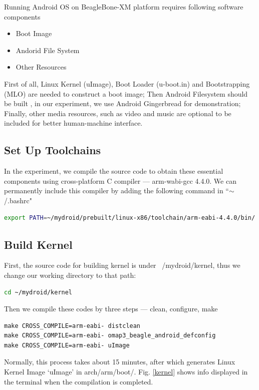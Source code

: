 \documentclass[12pt,journal,draftclsnofoot,onecolumn]{IEEEtran}
\begin{document}
Running Android OS on BeagleBone-XM platform requires following software components
\begin{itemize}
\item Boot Image
\item Andorid File System
\item Other Resources
\end{itemize}

First of all, Linux Kernel (uImage), Boot Loader (u-boot.in) and Bootstrapping (MLO)  are needed to construct a boot image; Then Android Filesystem should be built , in our experiment, we use Android Gingerbread for demonstration; Finally, other media resources, such as video and music are optional to be included for better human-machine interface. 

\subsection{Set Up Toolchains}
In the experiment, we compile the source code to obtain these essential components using cross-platform C compiler --- arm-wabi-gcc 4.4.0.
We can permanently include this compiler by adding the following command in ``$\sim$/.bashrc"

\begin{lstlisting}[language={bash}]
export PATH=~/mydroid/prebuilt/linux-x86/toolchain/arm-eabi-4.4.0/bin/:$PATH
\end{lstlisting}

\subsection{Build Kernel}
First, the source code for building kernel is under ~/mydroid/kernel, thus we change our working directory to that path:

\begin{lstlisting}[language={bash}]
cd ~/mydroid/kernel
\end{lstlisting}

Then we compile these codes by three steps --- clean, configure, make
\begin{lstlisting}[language={make}]
make CROSS_COMPILE=arm-eabi- distclean
make CROSS_COMPILE=arm-eabi- omap3_beagle_android_defconfig
make CROSS_COMPILE=arm-eabi- uImage
\end{lstlisting}

Normally, this process takes about 15 minutes, after which generates  Linux Kernel Image `uImage' in arch/arm/boot/. Fig. \ref{kernel}  shows  info displayed in the terminal when the compilation is completed.
\end{document}
